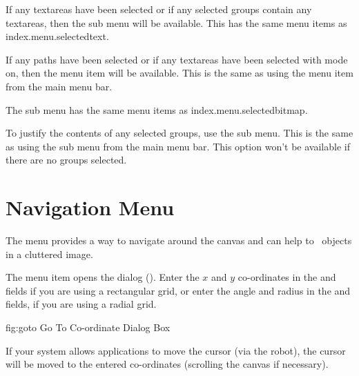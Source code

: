 
If any \glspl{textarea} have been selected or if any selected
\glspl{group} contain any \glspl{textarea}, then the
 sub menu will be available. This has the same
menu items as \gls{index.menu.selectedtext}.


If any \glspl{path} have been selected or if any \glspl*{textarea}
have been selected with  mode on, then the
 menu item will be available. This is the
same as using the  menu item from the main
menu bar.


The  sub menu has the same
menu items as \gls{index.menu.selectedbitmap}.


To justify the contents of any selected \glspl{group}, use the
 sub menu. This is the same as using the
 sub menu from the main menu bar.
This option won't be available if there are no
\glspl{group} selected.


\section{Navigation Menu}\label{sec:navigate}


The  menu provides a way to navigate around the
\gls{canvas} and can help to \select\ \glspl{object}
in a cluttered image.


The  menu item opens the
 dialog ().  Enter the
$x$ and $y$ co-ordinates in the  and
 fields if you are using a rectangular grid,
or enter the angle and radius in the  and
 fields, if you are using a radial grid.

\FloatFig
  {fig:goto}
  {}
  {Go To Co-ordinate Dialog Box}

If your system allows applications to move the cursor
(via the \gls{robot}), the cursor will be moved to the entered
co-ordinates (scrolling the \gls{canvas} if necessary).

